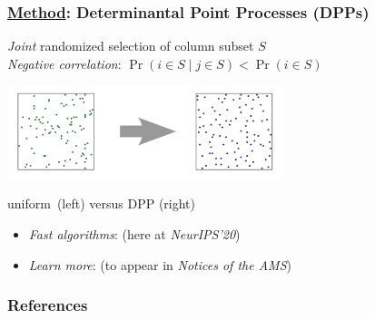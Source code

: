 \documentclass[10pt,handout]{beamer}
\begin{document}
\begin{frame}
  \frametitle{\underline{Method}: Determinantal Point Processes (DPPs)}
\onslide<+->
  \emph{Joint} randomized selection of column subset $S$\\[2mm]

  \onslide<+->
  \emph{Negative correlation}: $\Pr(i\in S\mid j\in S) < \Pr(i\in S)$
  \vspace{-2mm}
  
\begin{center}
  \includegraphics[width=0.6\textwidth]{../figs/gue.png}
  \vspace{-3mm}
  
  \small  uniform~(left) versus DPP (right)%
\end{center}
\vspace{-2mm}
\begin{itemize}
  \item \onslide<+->\emph{Fast algorithms}: \cite{alpha-dpp} (here at
    \textit{NeurIPS'20})\\[-1mm]
  \item \onslide<+->\emph{Learn more}: \cite{dpps-in-randnla}
    (to appear in \textit{Notices of the AMS})\\[-1mm]
\end{itemize}
\let\thefootnote\relax{}  
  \end{frame}


\begin{frame}[allowframebreaks]
  \frametitle{References}
  \tiny
  
  
\end{frame}

\end{document}
